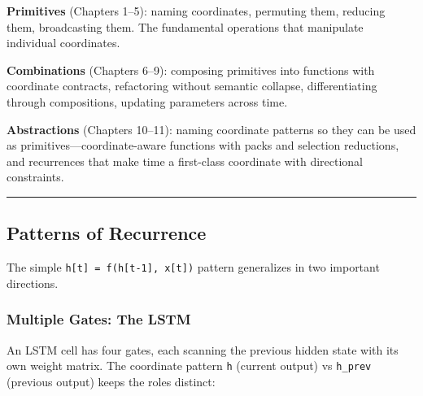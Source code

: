 \documentclass[11pt,]{article}
\begin{document}
\textbf{Primitives} (Chapters 1--5): naming coordinates, permuting them,
reducing them, broadcasting them. The fundamental operations that
manipulate individual coordinates.

\textbf{Combinations} (Chapters 6--9): composing primitives into
functions with coordinate contracts, refactoring without semantic
collapse, differentiating through compositions, updating parameters
across time.

\textbf{Abstractions} (Chapters 10--11): naming coordinate patterns so
they can be used as primitives---coordinate-aware functions with packs
and selection reductions, and recurrences that make time a first-class
coordinate with directional constraints.

\begin{center}\rule{0.5\linewidth}{0.4pt}\end{center}

\hypertarget{patterns-of-recurrence}{%
\subsection{Patterns of Recurrence}\label{patterns-of-recurrence}}

The simple \texttt{h{[}t{]}\ =\ f(h{[}t-1{]},\ x{[}t{]})} pattern
generalizes in two important directions.

\hypertarget{multiple-gates-the-lstm}{%
\subsubsection{Multiple Gates: The LSTM}\label{multiple-gates-the-lstm}}

An LSTM cell has four gates, each scanning the previous hidden state
with its own weight matrix. The coordinate pattern \texttt{h} (current
output) vs \texttt{h\_prev} (previous output) keeps the roles distinct:
\end{document}

